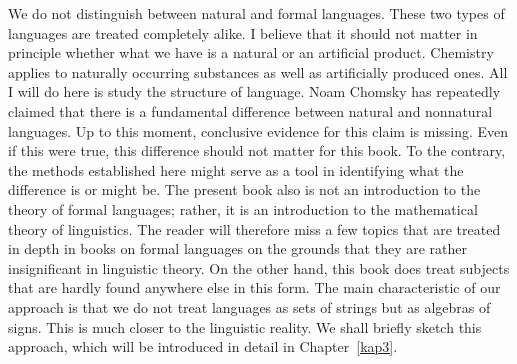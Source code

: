 We do not distinguish between natural and formal languages. These
two types of languages are treated completely alike. I believe
that it should not matter in principle whether what we have is a
natural or an artificial product. Chemistry applies to naturally
occurring substances as well as artificially produced ones. All I
will do here is study the structure of language. Noam Chomsky
has repeatedly claimed that there is a fundamental difference
between natural and nonnatural languages. Up to this 
moment, conclusive evidence for this claim is missing. Even if 
this were true, this difference should not matter for this book. 
To the contrary, the methods established here might serve as a tool
in identifying what the difference is or might be. The present
book also is not an introduction to the theory of formal
languages; rather, it is an introduction to the mathematical
theory of linguistics. The reader will therefore miss a few topics
that are treated in depth in books on formal languages on the
grounds that they are rather insignificant in linguistic theory.
On the other hand, this book does treat subjects that are hardly
found anywhere else in this form. The main characteristic of our
approach is that we do not treat languages as sets of strings but
as algebras of signs. This is much closer to the linguistic
reality. We shall briefly sketch this approach, which will be
introduced in detail in Chapter~\ref{kap3}.

